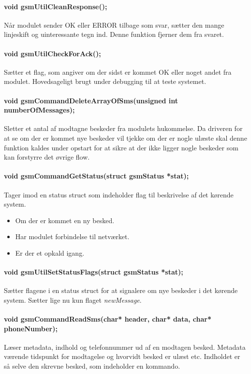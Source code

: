 \paragraph{void gsmUtilCleanResponse();}
Når modulet sender OK eller ERROR tilbage som svar, sætter den mange linjeskift og uinteressante tegn ind. Denne funktion fjerner dem fra svaret.

\paragraph{void gsmUtilCheckForAck();}
Sætter et flag, som angiver om der sidst er kommet OK eller noget andet fra modulet. Hovedsageligt brugt under debugging til at teste systemet.

\paragraph{void gsmCommandDeleteArrayOfSms(unsigned int numberOfMessages);}
Sletter et antal af modtagne beskeder fra modulets hukommelse. Da driveren for at se om der er kommet nye beskeder vil tjekke om der er nogle ulæste skal denne funktion kaldes under opstart for at sikre at der ikke ligger nogle beskeder som kan forstyrre det øvrige flow.

\paragraph{void gsmCommandGetStatus(struct gsmStatus *stat);}
Tager imod en status struct som indeholder flag til beskrivelse af det kørende system.

\begin{itemize}
	\item Om der er kommet en ny besked.
	\item Har modulet forbindelse til netværket.
	\item Er der et opkald igang.
\end{itemize}

\paragraph{void gsmUtilSetStatusFlags(struct gsmStatus *stat);}
Sætter flagene i en status struct for at signalere om nye beskeder i det kørende system. Sætter lige nu kun flaget \textit{newMessage}.

\paragraph{void gsmCommandReadSms(char* header, char* data, char* phoneNumber);}
Læser metadata, indhold og telefonnummer ud af en modtagen besked. Metadata værende tidspunkt for modtagelse og hvorvidt besked er ulæst etc. Indholdet er så selve den skrevne besked, som indeholder en kommando.

